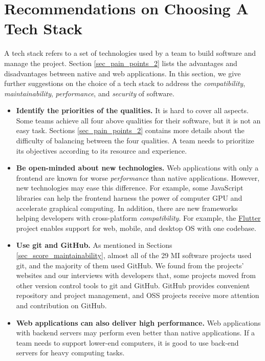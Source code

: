 \section{Recommendations on Choosing A Tech Stack}
\label{sec_recommendations_tech_stack}

A tech stack refers to a set of technologies used by a team to build software and manage the project. Section \ref{sec_pain_points_2} lists the advantages and disadvantages between native and web applications. In this section, we give further suggestions on the choice of a tech stack to address the \textit{compatibility}, \textit{maintainability}, \textit{performance}, and \textit{security} of software.

\begin{itemize}
\item \textbf{Identify the priorities of the qualities.} It is hard to cover all aspects. Some teams achieve all four above qualities for their software, but it is not an easy task. Sections \ref{sec_pain_points_2} contains more details about the difficulty of balancing between the four qualities. A team needs to prioritize its objectives according to its resource and experience.

\item \textbf{Be open-minded about new technologies.} Web applications with only a frontend are known for worse \textit{performance} than native applications. However, new technologies may ease this difference. For example, some JavaScript libraries can help the frontend harness the power of computer GPU and accelerate graphical computing. In addition, there are new frameworks helping developers with cross-platform \textit{compatibility}. For example, the \hyperlink{https://flutter.dev/}{Flutter} project enables support for web, mobile, and desktop OS with one codebase.

\item \textbf{Use git and GitHub.} 
As mentioned in Sections \ref{sec_score_maintainability}, almost all of the 29 MI software projects used git, and the majority of them used GitHub. We found from the projects' websites and our interviews with developers that, some projects moved from other version control tools to git and GitHub. GitHub provides convenient repository and project management, and OSS projects receive more attention and contribution on
GitHub.

\item \textbf{Web applications can also deliver high performance.} Web applications with backend servers may perform even better than native applications. If a team needs to support lower-end computers, it is good to use back-end servers for heavy computing tasks.


\end{itemize}
